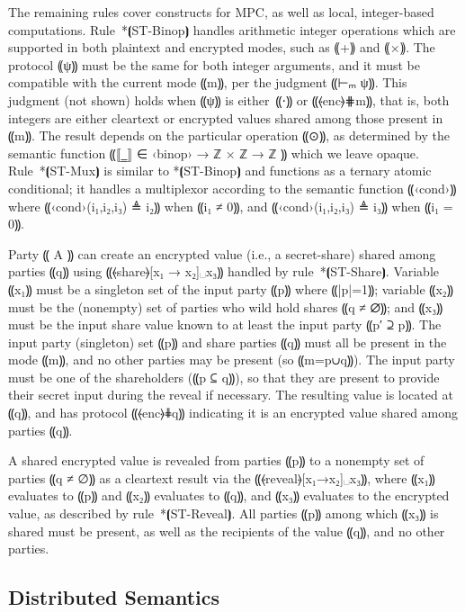The remaining rules cover constructs for MPC, as well as local,
integer-based computations.
%
Rule~*⦗ST-Binop⦘ handles arithmetic integer operations which are supported in
both plaintext and encrypted modes, such as ⸨+⸩ and ⸨×⸩. The protocol
⸨ψ⸩ must be the same for both integer arguments, and it must be compatible with the
current mode ⸨m⸩, per the judgment ⸨⊢ₘ ψ⸩. This judgment (not shown) holds when ⸨ψ⸩ is
either~⸨⋅⸩ or ⸨⦑enc⦒⋕m⸩, that is, both integers are either cleartext or
encrypted values shared among those present in ⸨m⸩. The result depends on the
particular operation ⸨⊙⸩, as determined by the semantic function ⸨⟦‗⟧ ∈ ‹binop›
→ ℤ × ℤ → ℤ ⸩ which we leave opaque.
Rule~*⦗ST-Mux⦘ is similar to *⦗ST-Binop⦘ and functions as a ternary atomic
conditional; it handles a multiplexor according to the semantic function
⸨‹cond›⸩ where ⸨‹cond›(i₁,i₂,i₃) ≜ i₂⸩ when ⸨i₁ ≠ 0⸩, and ⸨‹cond›(i₁,i₂,i₃) ≜ i₃⸩
when ⸨i₁ = 0⸩.

Party ⸨ A ⸩ can create an encrypted value (i.e., a
secret-share) shared among parties ⸨q⸩ using ⸨⦑share⦒[x₁ → x₂]␣x₃⸩ handled by
rule~*⦗ST-Share⦘. Variable ⸨x₁⸩ must be a singleton set of the input party
⸨p⸩ where ⸨|p|=1⸩; variable ⸨x₂⸩ must be the (nonempty) set of parties
who wild hold shares ⸨q ≠ ∅⸩; and
⸨x₃⸩ must be the input share value known to at least the input party ⸨p′ ⊇ p⸩.
The input party (singleton) set ⸨p⸩ and share parties ⸨q⸩ must all be present in
the mode ⸨m⸩, and no other parties may be present (so ⸨m=p∪q⸩). The input party
must be one of the shareholders (⸨p ⊆ q⸩), so that they are present to provide their secret
input during the reveal if necessary. The resulting value is located at ⸨q⸩, and has protocol
⸨⦑enc⦒⋕q⸩ indicating it is an encrypted value shared among parties ⸨q⸩.

A shared encrypted value is revealed from parties ⸨p⸩ to a nonempty set of
parties ⸨q ≠ ∅⸩ as a cleartext result via the ⸨⦑reveal⦒[x₁→x₂]␣x₃⸩, where ⸨x₁⸩
evaluates to ⸨p⸩ and ⸨x₂⸩ evaluates to ⸨q⸩, and ⸨x₃⸩ evaluates to the encrypted
value, as described by rule~*⦗ST-Reveal⦘. All parties ⸨p⸩ among which ⸨x₃⸩
is shared must be present, as well as the recipients of the value ⸨q⸩, and no
other parties.

\subsection{Distributed Semantics}
\label{subsec:mpc-design-dist}

